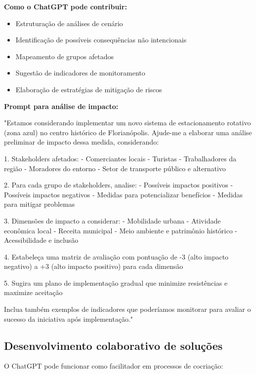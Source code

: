 \documentclass[12pt,a4paper]{book}
\begin{document}
\textbf{Como o ChatGPT pode contribuir:}
\begin{itemize}
    \item Estruturação de análises de cenário
    \item Identificação de possíveis consequências não intencionais
    \item Mapeamento de grupos afetados
    \item Sugestão de indicadores de monitoramento
    \item Elaboração de estratégias de mitigação de riscos
\end{itemize}

\begin{tcolorbox}[exemplo]
\textbf{Prompt para análise de impacto:}

"Estamos considerando implementar um novo sistema de estacionamento rotativo (zona azul) no centro histórico de Florianópolis. Ajude-me a elaborar uma análise preliminar de impacto dessa medida, considerando:

1. Stakeholders afetados:
   - Comerciantes locais
   - Turistas
   - Trabalhadores da região
   - Moradores do entorno
   - Setor de transporte público e alternativo

2. Para cada grupo de stakeholders, analise:
   - Possíveis impactos positivos
   - Possíveis impactos negativos
   - Medidas para potencializar benefícios
   - Medidas para mitigar problemas

3. Dimensões de impacto a considerar:
   - Mobilidade urbana
   - Atividade econômica local
   - Receita municipal
   - Meio ambiente e patrimônio histórico
   - Acessibilidade e inclusão

4. Estabeleça uma matriz de avaliação com pontuação de -3 (alto impacto negativo) a +3 (alto impacto positivo) para cada dimensão

5. Sugira um plano de implementação gradual que minimize resistências e maximize aceitação

Inclua também exemplos de indicadores que poderíamos monitorar para avaliar o sucesso da iniciativa após implementação."
\end{tcolorbox}

\subsection{Desenvolvimento colaborativo de soluções}

O ChatGPT pode funcionar como facilitador em processos de cocriação:
\end{document}
